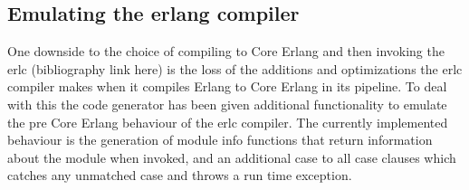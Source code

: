 \subsection{Emulating the erlang compiler}

One downside to the choice of compiling to Core Erlang and then invoking the erlc
(bibliography link here) is the loss of the additions and optimizations the erlc
compiler makes when it compiles Erlang to Core Erlang in its pipeline. To deal with this
the code generator has been given additional functionality to emulate the pre Core Erlang
behaviour of the erlc compiler. The currently implemented behaviour is the generation of module info functions that return information about the module when invoked, and an additional case to all case clauses which catches any unmatched case and throws a run time exception.